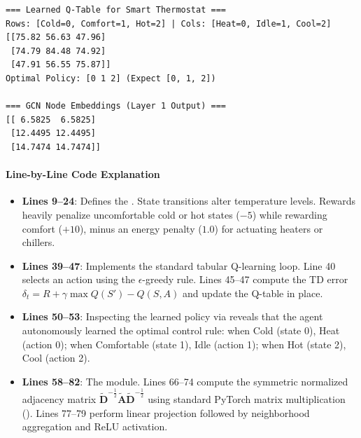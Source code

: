 \begin{lstlisting}[style=outputstyle, caption={Output of the Q-Learning and GCN demo script.}]
=== Learned Q-Table for Smart Thermostat ===
Rows: [Cold=0, Comfort=1, Hot=2] | Cols: [Heat=0, Idle=1, Cool=2]
[[75.82 56.63 47.96]
 [74.79 84.48 74.92]
 [47.91 56.55 75.87]]
Optimal Policy: [0 1 2] (Expect [0, 1, 2])

=== GCN Node Embeddings (Layer 1 Output) ===
[[ 6.5825  6.5825]
 [12.4495 12.4495]
 [14.7474 14.7474]]
\end{lstlisting}

\paragraph{Line-by-Line Code Explanation}
\begin{itemize}
    \item \textbf{Lines 9--24}: Defines the . State transitions alter temperature levels. Rewards heavily penalize uncomfortable cold or hot states ($-5$) while rewarding comfort ($+10$), minus an energy penalty ($1.0$) for actuating heaters or chillers.
    \item \textbf{Lines 39--47}: Implements the standard tabular Q-learning loop. Line 40 selects an action using the $\epsilon$-greedy rule. Lines 45--47 compute the TD error $\delta_t = R + \gamma \max Q(S') - Q(S, A)$ and update the Q-table in place.
    \item \textbf{Lines 50--53}: Inspecting the learned policy via  reveals that the agent autonomously learned the optimal control rule: when Cold (state 0), Heat (action 0); when Comfortable (state 1), Idle (action 1); when Hot (state 2), Cool (action 2).
    \item \textbf{Lines 58--82}: The  module. Lines 66--74 compute the symmetric normalized adjacency matrix $\mathbf{\tilde{D}}^{-\frac{1}{2}} \mathbf{\tilde{A}} \mathbf{\tilde{D}}^{-\frac{1}{2}}$ using standard PyTorch matrix multiplication (). Lines 77--79 perform linear projection followed by neighborhood aggregation and ReLU activation.
\end{itemize}


